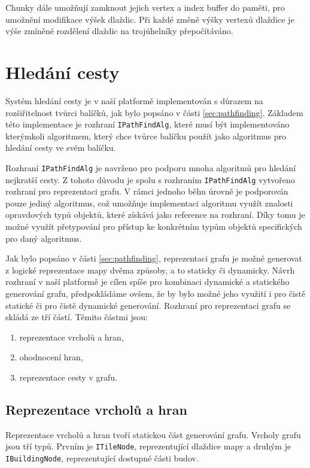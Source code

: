 Chunky dále umožňují zamknout jejich vertex a index buffer do paměti, pro umožnění modifikace výšek dlaždic. Při každé změně výšky vertexů dlaždice je výše zmíněné rozdělení dlaždic na trojúhelníky přepočítáváno.

\section{Hledání cesty}
\label{sec:pathfindingdocu}
Systém hledání cesty je v naší platformě implementován s důrazem na rozšiřitelnost tvůrci balíčků, jak bylo popsáno v části \ref{sec:pathfinding}. Základem této implementace je rozhraní \texttt{IPathFindAlg}, které musí být implementováno kterýmkoli algoritmem, který chce tvůrce balíčku použít jako algoritmus pro hledání cesty ve svém balíčku.

Rozhraní \texttt{IPathFindAlg} je navrženo pro podporu mnoha algoritmů pro hledání nejkratší cesty. Z tohoto důvodu je spolu s rozhraním \texttt{IPathFindAlg} vytvořeno rozhraní pro reprezentaci grafu. V rámci jednoho běhu úrovně je podporován pouze jediný algoritmus, což umožňuje implementaci algoritmu využít znalosti opravdových typů objektů, které získává jako reference na rozhraní. Díky tomu je možné využít přetypování pro přístup ke konkrétním typům objektů specifických pro daný algoritmus.

Jak bylo popsáno v části \ref{sec:pathfinding}, reprezentaci grafu je možné generovat z logické reprezentace mapy dvěma způsoby, a to staticky či dynamicky. Návrh rozhraní v naší platformě je cílen spíše pro kombinaci dynamické a statického generování grafu, předpokládáme ovšem, že by bylo možné jeho využití i pro čistě statické či pro čistě dynamické generování. Rozhraní pro reprezentaci grafu se skládá ze tří částí. Těmito částmi jsou:

\begin{enumerate}
	\item reprezentace vrcholů a hran,
	\item ohodnocení hran,
	\item reprezentace cesty v grafu.
\end{enumerate}

\subsection{Reprezentace vrcholů a hran}
Reprezentace vrcholů a hran tvoří statickou část generování grafu. Vrcholy grafu jsou tří typů. Prvním je \texttt{ITileNode}, reprezentující dlaždice mapy a druhým je \texttt{IBuildingNode}, reprezentující dostupné části budov.


